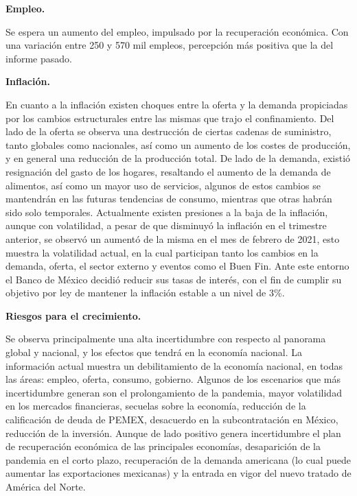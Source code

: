 \textbf{Empleo.}

Se espera un aumento del empleo, impulsado por la recuperación económica. Con una variación entre 250 y 570 mil empleos, percepción más positiva que la del informe pasado.

\textbf{Inflación.}

En cuanto a la inflación existen choques entre la oferta y la demanda propiciadas por los cambios estructurales entre las mismas que trajo el confinamiento.
Del lado de la oferta se observa una destrucción de ciertas cadenas de suministro, tanto globales como nacionales, así como un aumento de los costes de producción, y en general una reducción de la producción total.
De lado de la demanda, existió resignación del gasto de los hogares, resaltando el aumento de la demanda de alimentos, así como un mayor uso de servicios, algunos de estos cambios se mantendrán en las futuras tendencias de consumo, mientras que otras habrán sido solo temporales.
Actualmente existen presiones a la baja de la inflación, aunque con volatilidad, a pesar de que disminuyó la inflación en el trimestre anterior, se observó un aumentó de la misma en el mes de febrero de 2021, esto muestra la volatilidad actual, en la cual participan tanto los cambios en la demanda, oferta, el sector externo y eventos como el Buen Fin.
Ante este entorno el Banco de México decidió reducir sus tasas de interés, con el fin de cumplir su objetivo por ley de mantener la inflación estable a un nivel de 3\%.

\textbf{Riesgos para el crecimiento.}

Se observa principalmente una alta incertidumbre con respecto al panorama global y nacional, y los efectos que tendrá en la economía nacional. La información actual muestra un debilitamiento de la economía nacional, en todas las áreas: empleo, oferta, consumo, gobierno.
Algunos de los escenarios que más incertidumbre generan son el prolongamiento de la pandemia, mayor volatilidad en los mercados financieras, secuelas sobre la economía, reducción de la calificación de deuda de PEMEX, desacuerdo en la subcontratación en México, reducción de la inversión.
Aunque de lado positivo genera incertidumbre el plan de recuperación económica de las principales economías, desaparición de la pandemia en el corto plazo, recuperación de la demanda americana (lo cual puede aumentar las exportaciones mexicanas) y la entrada en vigor del nuevo tratado de América del Norte.\\

